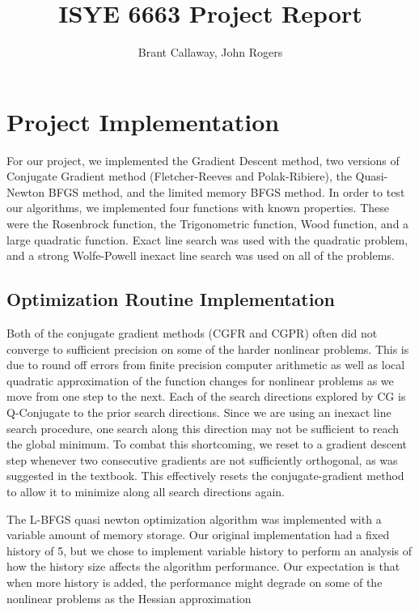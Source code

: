\documentclass[12pt]{amsart}
\title{ISYE 6663 Project Report}
\author{Brant Callaway, John Rogers}
\date{} %
\begin{document}
\maketitle

\section{Project Implementation}
For our project, we implemented the Gradient Descent method, two versions of Conjugate Gradient method (Fletcher-Reeves and Polak-Ribiere), the Quasi-Newton BFGS method, and the limited memory BFGS method. In order to test our algorithms, we implemented four functions with known properties.  These were the Rosenbrock function, the Trigonometric function, Wood function, and a large quadratic function.  Exact line search was used with the quadratic problem, and a strong Wolfe-Powell inexact line search was used on all of the problems.  

\subsection{Optimization Routine Implementation}

Both of the conjugate gradient methods (CGFR and CGPR) often did not converge to sufficient precision on some of the harder nonlinear problems.  This is due to round off errors from finite precision computer arithmetic as well as local quadratic approximation of the function changes for nonlinear problems as we move from one step to the next.  Each of the search directions explored by CG is Q-Conjugate to the prior search directions.  Since we are using an inexact line search procedure, one search along this direction may not be sufficient to reach the global minimum.  To combat this shortcoming, we reset to a gradient descent step whenever two consecutive gradients are not sufficiently orthogonal, as was suggested in the textbook.  This effectively resets the conjugate-gradient method to allow it to minimize along all search directions again.

The L-BFGS quasi newton optimization algorithm was implemented with a variable amount of memory storage.  Our original implementation had a fixed history of 5, but we chose to implement variable history to perform an analysis of how the history size affects the algorithm performance.  Our expectation is that when more history is added, the performance might degrade on some of the nonlinear problems as the Hessian approximation 
\end{document}
